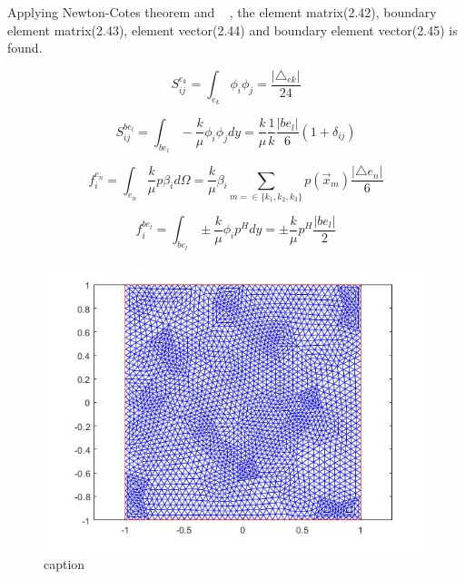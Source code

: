 \documentclass[a4paper]{report}
\begin{document}
Applying Newton-Cotes theorem and ~ , the element matrix(2.42), boundary element matrix(2.43), element vector(2.44) and boundary element vector(2.45) is found.

\begin{equation}
S^{e_k}_{ij}=\int_{e_k}\phi_i\phi_j = \frac{\lvert\triangle_{ek}\rvert}{24}
\end{equation}

\begin{equation}
S^{be_l}_{ij}=\int_{be_l}-\frac{k}{\mu}\phi_i\phi_j dy = \frac{k}{\mu}\frac{1}{k}\frac{\lvert be_l\rvert}{6}(1+\delta_{ij})
\end{equation}

\begin{equation}
f^{e_n}_{i} = \int_{e_n}\frac{k}{\mu}p\beta_i d\Omega = \frac{k}{\mu}\beta_i\sum_{m=\in\{k_1,k_2,k_3\}} p(\vec{x}_m) \frac{\lvert \triangle e_n\rvert}{6}
\end{equation}

\begin{equation}
f^{be_l}_{i}=\int_{be_l}\pm \frac{k}{\mu}\phi_ip^H dy = \pm \frac{k}{\mu}p^H \frac{\lvert be_l\rvert}{2}
\end{equation}


\begin{figure}[ht!]
	\centering
	\includegraphics[width=150mm]{meshgrid2D.jpg}
	\caption{caption
 \label{overflow}}
\end{figure}
\end{document}

